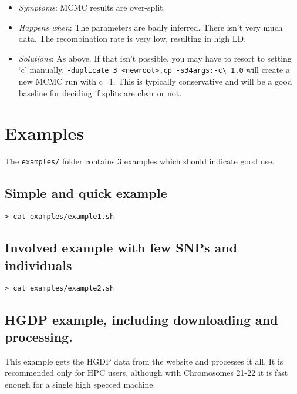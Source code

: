 \documentclass[11pt]{article}
\begin{document}
\begin{enumerate}
\begin{itemize}
\item \emph{Symptoms}:  MCMC results are over-split.
\item \emph{Happens when}: The parameters are badly inferred. There isn't very much data. The recombination rate is very low, resulting in high LD.
\item \emph{Solutions}: As above. If that isn't possible, you may have to resort to setting `c' manually. \verb!-duplicate 3 <newroot>.cp -s34args:-c\ 1.0! will create a new MCMC run with c=1. This is typically conservative and will be a good baseline for deciding if splits are clear or not.
\end{itemize}
\end{enumerate}

\section{Examples}

The \verb!examples/! folder contains 3 examples which should indicate good use. 

\subsection{Simple and quick example}
\begin{lstlisting}[caption=example1: simple use case on a small dataset.]
> cat examples/example1.sh
\end{lstlisting}


\subsection{Involved example with few SNPs and individuals}
\begin{lstlisting}[caption=example2: complex use case on a larger dataset split by chromosome.]
> cat examples/example2.sh
\end{lstlisting}


\subsection{HGDP example, including downloading and processing.}
This example gets the HGDP data from the website and processes it all. It is recommended only for HPC users, although with Chromosomes 21-22 it is fast enough for a single high specced machine.
\end{document}
